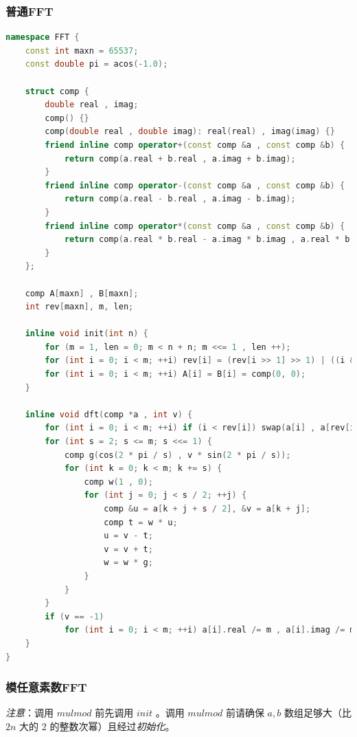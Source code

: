 \documentclass{article}
\begin{document}
\subsubsection{普通FFT}

\begin{lstlisting}[language=C++]
namespace FFT {
	const int maxn = 65537;
	const double pi = acos(-1.0);

	struct comp {
		double real , imag;
		comp() {}
		comp(double real , double imag): real(real) , imag(imag) {}
		friend inline comp operator+(const comp &a , const comp &b) {
			return comp(a.real + b.real , a.imag + b.imag);
		}
		friend inline comp operator-(const comp &a , const comp &b) {
			return comp(a.real - b.real , a.imag - b.imag);
		}
		friend inline comp operator*(const comp &a , const comp &b) {
			return comp(a.real * b.real - a.imag * b.imag , a.real * b.imag + a.imag * b.real);
		}
	};

	comp A[maxn] , B[maxn];
	int rev[maxn], m, len;

	inline void init(int n) {
		for (m = 1, len = 0; m < n + n; m <<= 1 , len ++);
		for (int i = 0; i < m; ++i) rev[i] = (rev[i >> 1] >> 1) | ((i & 1) << (len - 1));
        for (int i = 0; i < m; ++i) A[i] = B[i] = comp(0, 0);
	}

	inline void dft(comp *a , int v) {
		for (int i = 0; i < m; ++i) if (i < rev[i]) swap(a[i] , a[rev[i]]);
		for (int s = 2; s <= m; s <<= 1) {
			comp g(cos(2 * pi / s) , v * sin(2 * pi / s));
			for (int k = 0; k < m; k += s) {
				comp w(1 , 0);
                for (int j = 0; j < s / 2; ++j) {
					comp &u = a[k + j + s / 2], &v = a[k + j];
					comp t = w * u;
					u = v - t;
					v = v + t;
					w = w * g;
				}
			}
		}
		if (v == -1)
			for (int i = 0; i < m; ++i) a[i].real /= m , a[i].imag /= m;
	}
}
\end{lstlisting}

\subsubsection{模任意素数FFT}

\emph{注意}：调用 $mulmod$ 前先调用 $init$ 。调用 $mulmod$ 前请确保 $a, b$  数组足够大（比 $2n$ 大的 $2$ 的整数次幂）且经过\emph{初始化}。
\end{document}
